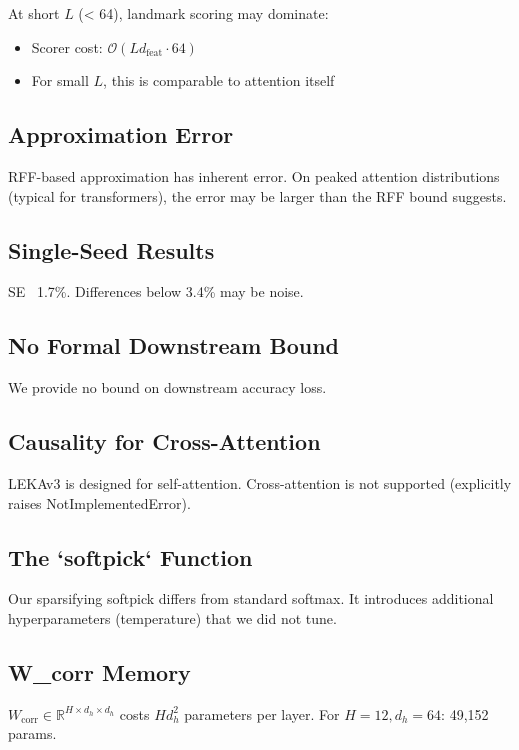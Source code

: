 At short $L$ (< 64), landmark scoring may dominate:
\begin{itemize}
\item Scorer cost: $\mathcal{O}(L d_\text{feat} \cdot 64)$
\item For small $L$, this is comparable to attention itself

\end{itemize}
\subsection{Approximation Error}

RFF-based approximation has inherent error. On peaked attention 
distributions (typical for transformers), the error may be larger than 
the RFF bound suggests.

\subsection{Single-Seed Results}

SE ~1.7\%. Differences below 3.4\% may be noise.

\subsection{No Formal Downstream Bound}

We provide no bound on downstream accuracy loss.

\subsection{Causality for Cross-Attention}

LEKAv3 is designed for self-attention. Cross-attention is not supported 
(explicitly raises NotImplementedError).

\subsection{The `softpick` Function}

Our sparsifying softpick differs from standard softmax. It introduces 
additional hyperparameters (temperature) that we did not tune.

\subsection{W\_corr Memory}

$W_\text{corr} \in \mathbb{R}^{H \times d_h \times d_h}$ costs 
$H d_h^2$ parameters per layer. For $H = 12, d_h = 64$: 49,152 params.

